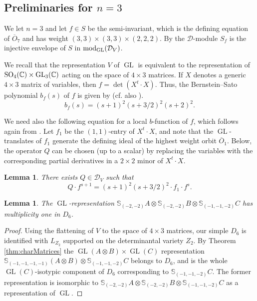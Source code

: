 \documentclass[11pt,reqno]{amsart}
\newcommand{\D}{\mathcal{D}}
\newcommand{\oo}{\otimes}
\newcommand{\bS}{\mathbb{S}}
\newcommand{\tn}{\textnormal}
\newcommand{\C}{\mathbb{C}}
\newcommand{\GL}{\operatorname{GL}}
\renewcommand{\det}{\operatorname{det}}
\newcommand{\ol}[1]{\overline{#1}}
\newtheorem{lemma}[theorem]{Lemma}
\numberwithin{equation}{section}
\begin{document}
\subsection{Preliminaries for $n=3$} We let $n=3$ and let $f\in S$ be the semi-invariant, which is the defining equation of $\overline{O}_7$ and has weight $(3,3)\times (3,3)\times (2,2,2)$. By \cite[Lemma 2.4]{binary} the $\D$-module $S_f$ is the injective envelope of $S$ in $\tn{mod}_{\tn{GL}}(\D_V)$.

We recall that the representation $V$ of $\GL$ is equivalent to the representation of $\tn{SO}_{4}(\C) \times \GL_3(\C)$ acting on the space of $4\times 3$ matrices. If $X$ denotes a generic $4\times 3$ matrix of variables, then $f=\det(X^t \cdot X)$. Thus, the Bernstein--Sato polynomial $b_f(s)$ of $f$ is given by \cite[Example 2.9]{decomp} (cf. also \cite[Example 9.2]{microlocal}).
\begin{equation}\label{eq:bs3}
b_f(s)= (s+1)^2 (s+3/2)^2 (s+2)^2.
\end{equation}

We need also the following equation for a local $b$-function of $f$, which follows again from \cite[Example 2.9]{decomp}. Let $f_1$ be the $(1,1)$-entry of $X^t \cdot X$, and note that the $\GL$-translates of $f_1$ generate the defining ideal of the highest weight orbit $\ol{O}_1$. Below, the operator $Q$ can be chosen (up to a scalar) by replacing the variables with the corresponding partial derivatives in a $2\times 2$ minor of $X^t \cdot X$.
\begin{lemma}\label{lem:loc3}
There exists $Q \in \D_V$ such that
\[Q \cdot f^{s+1} = (s+1)^2 (s+3/2)^2 \cdot f_{1} \cdot f^s.\]
\end{lemma}

\begin{lemma}\label{lem:witD6}
The $\GL$-representation $\bS_{(-2,-2)}A\oo \bS_{(-2,-2)}B\oo \bS_{(-1,-1,-2)}C$ has multiplicity one in $D_6$.
\end{lemma}

\begin{proof}
Using the flattening of $V$ to the space of $4\times 3$ matrices, our simple $D_6$ is identified with $L_{Z_2}$ supported on the determinantal variety $Z_2$. By Theorem \ref{thm:charMatrices} the $\GL(A\oo B)\times \GL(C)$ representation $\bS_{(-1,-1,-1,-1)}(A\oo B)\oo \bS_{(-1,-1,-2)}C$ belongs to $D_6$, and is the whole $\GL(C)$-isotypic component of $D_6$ corresponding to $\bS_{(-1,-1,-2)}C$. The former representation is isomorphic to $\bS_{(-2,-2)}A\oo \bS_{(-2,-2)}B\oo \bS_{(-1,-1,-2)}C$ as a representation of $\GL$.
\end{proof}
\end{document}
